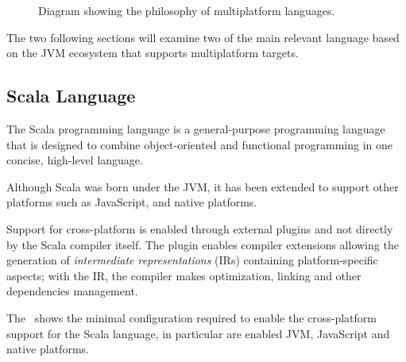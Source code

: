 \begin{figure}
	\centering
	\caption{Diagram showing the philosophy of multiplatform languages.}
	\label{fig:mulitplatform-languages}
\end{figure}


The two following sections will examine two of the main relevant language based on the JVM ecosystem that supports multiplatform targets.

\subsection{Scala Language}
\label{sec:scala-language}

The Scala programming language is a general-purpose programming language that is designed to combine object-oriented and functional programming in one
concise, high-level language.

Although Scala was born under the JVM, it has been extended to support other platforms such as JavaScript, and native platforms.

Support for cross-platform is enabled through external plugins and not directly by the Scala compiler itself.
The plugin enables compiler extensions allowing the generation of \emph{intermediate representations} (IRs) containing platform-specific aspects;
with the IR, the compiler makes optimization, linking and other dependencies management.

The~ shows the minimal configuration required to enable the cross-platform support for the Scala language,
in particular are enabled JVM, JavaScript and native platforms.



